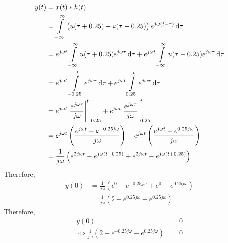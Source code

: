 \documentclass[fleqn, a4paper, 11pt, oneside]{amsart}
\theoremstyle{definition}
\theoremstyle{theorem}
\begin{document}
\begin{solution}
	\begin{align*}
		y(t) & = x(t) \ast h(t)                                                                                                                                                                      \\
                     & = \int\limits_{-\infty}^{\infty} \left( u(\tau + 0.25) - u(\tau - 0.25) \right) e^{j \omega (t - \tau)} \dif \tau                                                                     \\
                     & = e^{j \omega t} \int\limits_{-\infty}^{\infty} u(\tau + 0.25) e^{j \omega \tau} \dif \tau + e^{j \omega t} \int\limits_{-\infty}^{\infty} u(\tau - 0.25) e^{j \omega \tau} \dif \tau \\
                     & = e^{j \omega t} \int\limits_{-0.25}^{t} e^{j \omega \tau} \dif \tau + e^{j \omega t} \int\limits_{0.25}^{t} e^{j \omega \tau} \dif \tau                                              \\
                     & = e^{j \omega t} \left. \frac{e^{j \omega \tau}}{j \omega} \right|_{-0.25}^{t} + e^{j \omega t} \left. \frac{e^{j \omega \tau}}{j \omega} \right|_{0.25}^{t}                          \\
                     & = e^{j \omega t} \left( \frac{e^{j \omega t} - e^{-0.25 j \omega}}{j \omega} \right) + e^{j \omega t} \left( \frac{e^{j \omega t} - e^{0.25 j \omega}}{j \omega} \right)              \\
                     & = \frac{1}{j \omega} \left( e^{2 j \omega t} - e^{j \omega (t - 0.25)} + e^{2 j \omega t} - e^{j \omega (t + 0.25)} \right)                                                           \\
	\end{align*}
	Therefore,
	\begin{align*}
		y(0) & = \frac{1}{j \omega} \left( e^0 - e^{-0.25 j \omega} + e^0 - e^{0.25 j \omega} \right) \\
                     & = \frac{1}{j \omega} \left( 2 - e^{0.25 j \omega} - e^{0.25 j \omega} \right)
	\end{align*}
	Therefore,
	\begin{align*}
		y(0)                                                                              & = 0                                                \\
		\iff \frac{1}{j \omega} \left( 2 - e^{-0.25 j \omega} - e^{0.25 j \omega} \right) & = 0                                                \\

\end{align*}
\end{solution}
\end{document}
